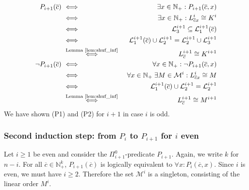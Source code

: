\documentclass[envcountsame]{llncs}
\renewcommand{\L}{\mathcal L}
\newcommand{\N}{\mathbb N}
\newcommand{\M}{\mathcal M}
\renewcommand{\L}{\mathcal L}
\begin{document}
\begin{eqnarray*}
P_{i+1}(\overline{c}) \ & \Longleftrightarrow & \ \exists x \in \N_+ : P_{i+1}(\overline{c},x) \\
 & \Longleftrightarrow & \ \exists x \in \N_+ : L^i_{\overline{c}x} \cong K^i \\
 & \Longleftrightarrow & \  \L^{i+1}_3\subseteq \L^{i+1}_1(\overline{c}) \\
 & \Longleftrightarrow & \  \L^{i+1}_1(\overline{c})\cup \L^{i+1}_2 = \L^{i+1}_2\cup \L^{i+1}_3 \\
 & \stackrel{\text{Lemma~\ref{lem:shuf_inf}}}{\Longleftrightarrow} & \ L^{i+1}_{\overline{c}}\cong K^{i+1} \\
\neg P_{i+1}(\overline{c}) \ & \Longleftrightarrow & \ \forall x \in \N_+ : \neg P_{i+1}(\overline{c},x) \\
 & \Longleftrightarrow & \ \forall x \in \N_+  \; \exists M \in \M^i : L^i_{\overline{c}x} \cong M \\
 & \Longleftrightarrow & \  \L^{i+1}_1(\overline{c})\cup \L^{i+1}_2 = \L^{i+1}_2 \\
 & \stackrel{\text{Lemma~\ref{lem:shuf_inf}}}{\Longleftrightarrow} & \ L^{i+1}_{\overline{c}}\cong M^{i+1}  
 \end{eqnarray*}
 We have shown (P1) and (P2) for $i+1$ in case $i$ is odd.


\subsubsection{Second induction step: from $P_i$ to $P_{i+1}$ for $i$ even} 
\label{second-induction-step}

Let $i \geq 1$ be even and
consider the $\Pi^0_{i+1}$-predicate $P_{i+1}$. 
Again, we write $k$ for $n-i$. For all 
$\overline{c}\in \N^{k}_+$, $P_{i+1}(\overline{c})$ is 
logically equivalent to $\forall x: P_i(\overline{c},x)$. 
Since $i$ is even, we must have $i \geq 2$. Therefore 
the set $\M^i$ is a singleton, consisting of the linear order $M^i$.
\end{document}
